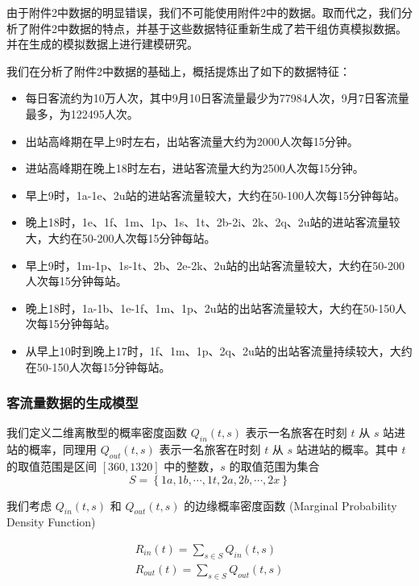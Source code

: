 \documentclass[12pt,a4paper]{mcmthesis}
\begin{document}
    由于附件2中数据的明显错误，我们不可能使用附件2中的数据。取而代之，我们分析了附件2中数据的特点，并基于这些数据特征重新生成了若干组仿真模拟数据。并在生成的模拟数据上进行建模研究。

    我们在分析了附件2中数据的基础上，概括提炼出了如下的数据特征：

    \begin{itemize}
        \item 每日客流约为10万人次，其中9月10日客流量最少为77984人次，9月7日客流量最多，为122495人次。
        \item 出站高峰期在早上9时左右，出站客流量大约为2000人次每15分钟。
        \item 进站高峰期在晚上18时左右，进站客流量大约为2500人次每15分钟。
        \item 早上9时，1a-1e、2u站的进站客流量较大，大约在50-100人次每15分钟每站。
        \item 晚上18时，1e、1f、1m、1p、1s、1t、2b-2i、2k、2q、2u站的进站客流量较大，大约在50-200人次每15分钟每站。
        \item 早上9时，1m-1p、1s-1t、2b、2e-2k、2u站的出站客流量较大，大约在50-200人次每15分钟每站。
        \item 晚上18时，1a-1b、1e-1f、1m、1p、2u站的出站客流量较大，大约在50-150人次每15分钟每站。
        \item 从早上10时到晚上17时，1f、1m、1p、2q、2u站的出站客流量持续较大，大约在50-150人次每15分钟每站。
    \end{itemize}

    \subsubsection{客流量数据的生成模型}

    我们定义二维离散型的概率密度函数 $Q_{in}(t,s)$ 表示一名旅客在时刻 $t$ 从 $s$ 站进站的概率，同理用 $Q_{out}(t,s)$ 表示一名旅客在时刻 $t$ 从 $s$ 站进站的概率。其中 $t$ 的取值范围是区间 $[360,1320]$ 中的整数，$s$ 的取值范围为集合
    \[ S = \left\{ 1a,1b,\cdots,1t,2a,2b,\cdots,2x \right\} \]

    我们考虑 $Q_{in}(t,s)$ 和 $Q_{out}(t,s)$ 的边缘概率密度函数 (Marginal Probability Density Function)

    \begin{equation*}
        \begin{aligned}
            R_{in}(t) = \sum_{s \in S} Q_{in}(t,s) \\
            R_{out}(t) = \sum_{s \in S} Q_{out}(t,s)
        \end{aligned}
    \end{equation*}
\end{document}
